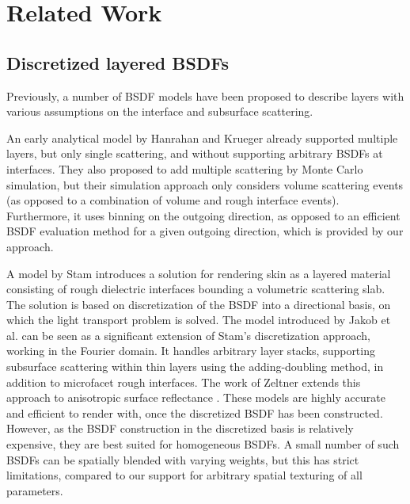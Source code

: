 \section{Related Work}
\label{sec:layeredbsdf:related}

\subsection{Discretized layered BSDFs}
Previously, a number of BSDF models have been proposed to describe layers with various assumptions on the interface and subsurface scattering.

An early analytical model by Hanrahan and Krueger \cite{hanrahan1993reflection} already supported multiple layers, but only single scattering, and without supporting arbitrary BSDFs at interfaces. They also proposed to add multiple scattering by Monte Carlo simulation, but their simulation approach only considers volume scattering events (as opposed to a combination of volume and rough interface events). Furthermore, it uses binning on the outgoing direction, as opposed to an efficient BSDF evaluation method for a given outgoing direction, which is provided by our approach.

A model by Stam \cite{stam2001illumination} introduces a solution for rendering skin as a layered material consisting of rough dielectric interfaces bounding a volumetric scattering slab. The solution is based on discretization of the BSDF into a directional basis, on which the light transport problem is solved. The model introduced by Jakob et al. \cite{jakob2014comprehensive} can be seen as a significant extension of Stam's discretization approach, working in the Fourier domain. It handles arbitrary layer stacks, supporting subsurface scattering within thin layers using the adding-doubling method, in addition to microfacet rough interfaces. The work of Zeltner extends this approach to anisotropic surface reflectance \cite{zeltner2018layer}. These models are highly accurate and efficient to render with, once the discretized BSDF has been constructed. However, as the BSDF construction in the discretized basis is relatively expensive, they are best suited for homogeneous BSDFs. A small number of such BSDFs can be spatially blended with varying weights, but this has strict limitations, compared to our support for arbitrary spatial texturing of all parameters.

